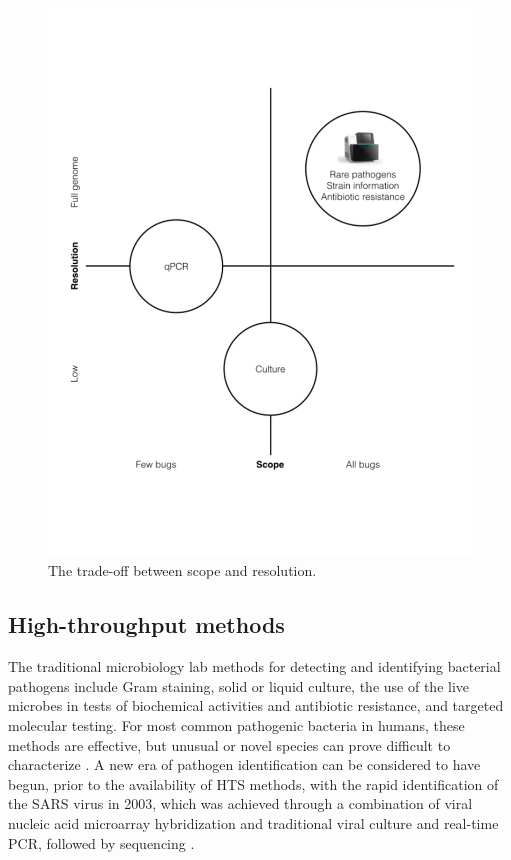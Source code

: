 \begin{figure}
\center\includegraphics[width=125mm,scale=0.5]{Figures/Fig2}
\caption{The trade-off between scope and resolution.}
\label{fig:Fig2}
\end{figure}

\subsection{High-throughput methods}

The traditional microbiology lab methods for detecting and identifying bacterial pathogens include Gram staining, solid or liquid culture, the use of the live microbes in tests of biochemical activities and antibiotic resistance, and targeted molecular testing. For most common pathogenic bacteria in humans, these methods are effective, but unusual or novel species can prove difficult to characterize \cite{Boyd:2013cc}. A new era of pathogen identification can be considered to have begun, prior to the availability of HTS methods, with the rapid identification of the SARS virus in 2003, which was achieved through a combination of viral nucleic acid microarray hybridization and traditional viral culture and real-time PCR, followed by sequencing \cite{Boyd:2013cc}.

